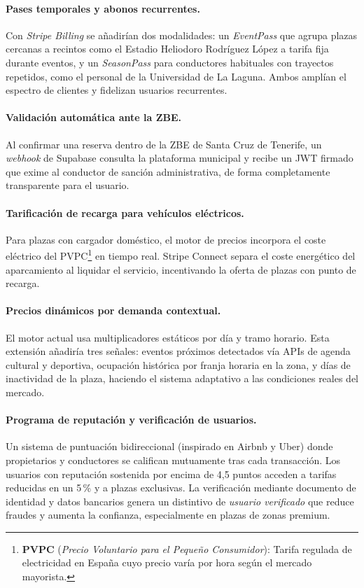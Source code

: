 \paragraph{Pases temporales y abonos recurrentes.} Con \textit{Stripe Billing} se añadirían dos modalidades: un \textit{EventPass} que agrupa plazas cercanas a recintos como el Estadio Heliodoro Rodríguez López a tarifa fija durante eventos, y un \textit{SeasonPass} para conductores habituales con trayectos repetidos, como el personal de la Universidad de La Laguna. Ambos amplían el espectro de clientes y fidelizan usuarios recurrentes.

\paragraph{Validación automática ante la ZBE.} Al confirmar una reserva dentro de la ZBE de Santa Cruz de Tenerife, un \textit{webhook} de Supabase consulta la plataforma municipal y recibe un JWT firmado que exime al conductor de sanción administrativa, de forma completamente transparente para el usuario.

\paragraph{Tarificación de recarga para vehículos eléctricos.} Para plazas con cargador doméstico, el motor de precios incorpora el coste eléctrico del PVPC\footnote{\textbf{PVPC} (\textit{Precio Voluntario para el Pequeño Consumidor}): Tarifa regulada de electricidad en España cuyo precio varía por hora según el mercado mayorista.} en tiempo real. Stripe Connect separa el coste energético del aparcamiento al liquidar el servicio, incentivando la oferta de plazas con punto de recarga.

\paragraph{Precios dinámicos por demanda contextual.} El motor actual usa multiplicadores estáticos por día y tramo horario. Esta extensión añadiría tres señales: eventos próximos detectados vía APIs de agenda cultural y deportiva, ocupación histórica por franja horaria en la zona, y días de inactividad de la plaza, haciendo el sistema adaptativo a las condiciones reales del mercado.

\paragraph{Programa de reputación y verificación de usuarios.} Un sistema de puntuación bidireccional (inspirado en Airbnb y Uber) donde propietarios y conductores se califican mutuamente tras cada transacción. Los usuarios con reputación sostenida por encima de 4,5 puntos acceden a tarifas reducidas en un 5\,\% y a plazas exclusivas. La verificación mediante documento de identidad y datos bancarios genera un distintivo de \textit{usuario verificado} que reduce fraudes y aumenta la confianza, especialmente en plazas de zonas premium.

